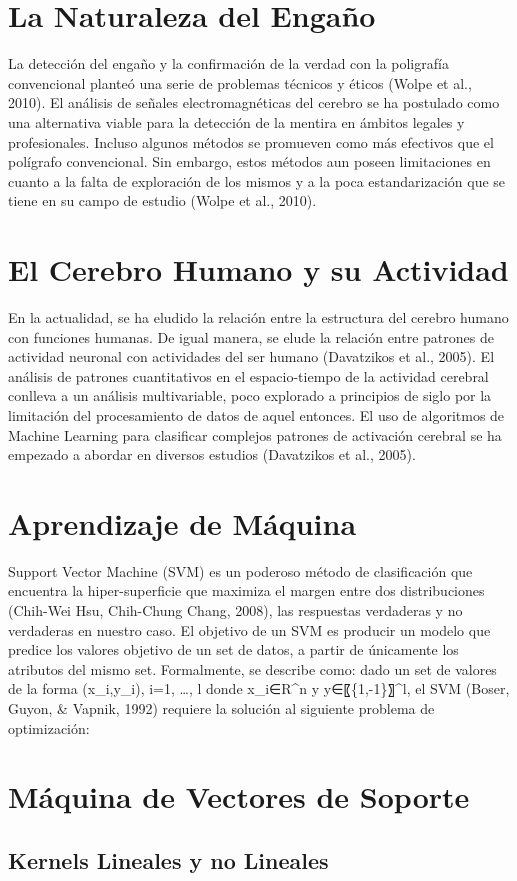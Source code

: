\section{La Naturaleza del Engaño}
La detección del engaño y la confirmación de la verdad con la poligrafía convencional planteó una serie de problemas técnicos y éticos (Wolpe et al., 2010).  El análisis de señales electromagnéticas del cerebro se ha postulado como una alternativa viable para la detección de la mentira en ámbitos legales y profesionales. Incluso algunos métodos se promueven como más efectivos que el polígrafo convencional. Sin embargo, estos métodos aun poseen limitaciones en cuanto a la falta de exploración de los mismos y a la poca estandarización que se tiene en su campo de estudio (Wolpe et al., 2010). 
\section{El Cerebro Humano y su Actividad}
En la actualidad, se ha eludido la relación entre la estructura del cerebro humano con funciones humanas. De igual manera, se elude la relación entre patrones de actividad neuronal con actividades del ser humano (Davatzikos et al., 2005). El análisis de patrones cuantitativos en el espacio-tiempo de la actividad cerebral conlleva a un análisis multivariable, poco explorado a principios de siglo por la limitación del procesamiento de datos de aquel entonces. El uso de algoritmos de Machine Learning para clasificar complejos patrones de activación cerebral se ha empezado a abordar en diversos estudios (Davatzikos et al., 2005). 
\section{Aprendizaje de Máquina}
Support Vector Machine (SVM) es un poderoso método de clasificación que encuentra la hiper-superficie que maximiza el margen entre dos distribuciones (Chih-Wei Hsu, Chih-Chung Chang, 2008), las respuestas verdaderas y no verdaderas en nuestro caso. El objetivo de un SVM es producir un modelo que predice los valores objetivo de un set de datos, a partir de únicamente los atributos del mismo set.  Formalmente, se describe como: dado un set de valores de la forma \gls{(x_i,y_i), i=1, …, l donde x_i∈R^n y y∈〖{1,-1}〗^l}, el SVM (Boser, Guyon, & Vapnik, 1992) requiere la solución al siguiente problema de optimización: 
\section{Máquina de Vectores de Soporte}
\subsection{Kernels Lineales y no Lineales}




